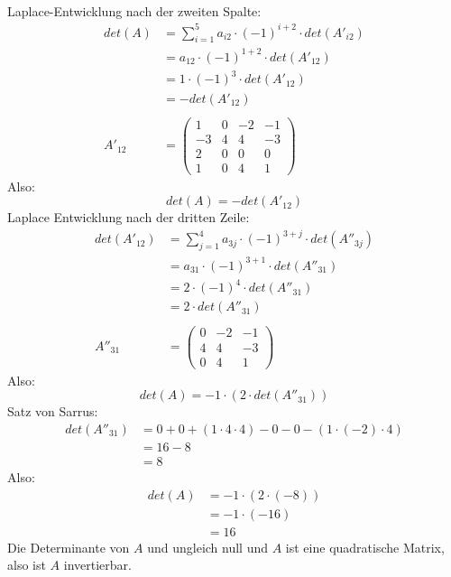 \documentclass{article} %
\begin{document}
\[\begin{array}{rrrrrr}
\end{array}
\]
Laplace-Entwicklung nach der zweiten Spalte:
\begin{align*}
   det(A) & =  \sum^5_{i=1} a_{i2} \cdot (-1)^{i+2} \cdot det(A'_{i2}) \\
   & = a_{12} \cdot (-1)^{1+2} \cdot det(A'_{12}) \\
    & = 1 \cdot (-1)^{3} \cdot det(A'_{12})  \\
    & = -det (A'_{12})  \\ \\
    A'_{12} & = \begin{pmatrix}
    1 &  0 & -2 & -1 \\
    -3   & 4 & 4 & -3 \\
    2   & 0 & 0 & 0 \\
    1   & 0 & 4 & 1  
\end{pmatrix}
\end{align*}
Also: 
\[
  det(A) = -det (A'_{12})
\]
Laplace Entwicklung nach der dritten Zeile: 
\begin{align*}
    det(A'_{12}) & = \sum^4_{j=1} a_{3j} \cdot (-1)^{3+j} \cdot det(A''_{3j}) \\
    & = a_{31} \cdot (-1)^{3+1} \cdot det(A''_{31}) \\
     & = 2 \cdot (-1)^{4} \cdot det(A''_{31}) \\
     & = 2 \cdot det(A''_{31}) \\ \\
      A''_{31} & = \begin{pmatrix}
     0 & -2 & -1 \\
     4 & 4 & -3 \\
     0 & 4 & 1  
\end{pmatrix}
\end{align*}
Also: 
\[
  det(A) = -1 \cdot (2 \cdot det(A''_{31}))
\]
Satz von Sarrus: 
\begin{align*}
    det(A''_{31}) & = 0 + 0 + (1 \cdot 4 \cdot 4) - 0 - 0 - (1 \cdot (-2) \cdot 4) \\ 
    & = 16 - 8\\ 
    & = 8
\end{align*}
Also: 
\begin{align*}
    det(A) & = -1 \cdot (2 \cdot (-8)) \\
    & = -1 \cdot (-16) \\
    & = 16 
\end{align*}
Die Determinante von $A$ und ungleich null und $A$ ist eine quadratische Matrix, also ist $A$ invertierbar. 
\end{document}
